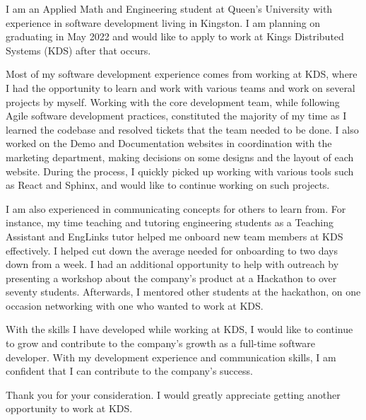 \documentclass[../bryan-hoang-cover-letter.tex]{subfiles}
\begin{document}



  \makelettertitle{}

  \begin{cvletter}
    I am an Applied Math and Engineering student at Queen's University with experience in software development living in Kingston. I am planning on graduating in May 2022 and would like to apply to work at Kings Distributed Systems (KDS) after that occurs.

    Most of my software development experience comes from working at KDS, where I had the opportunity to learn and work with various teams and work on several projects by myself. Working with the core development team, while following Agile software development practices, constituted the majority of my time as I learned the codebase and resolved tickets that the team needed to be done. I also worked on the Demo and Documentation websites in coordination with the marketing department, making decisions on some designs and the layout of each website. During the process, I quickly picked up working with various tools such as React and Sphinx, and would like to continue working on such projects.

    I am also experienced in communicating concepts for others to learn from. For instance, my time teaching and tutoring engineering students as a Teaching Assistant and EngLinks tutor helped me onboard new team members at KDS effectively. I helped cut down the average needed for onboarding to two days down from a week. I had an additional opportunity to help with outreach by presenting a workshop about the company's product at a Hackathon to over seventy students. Afterwards, I mentored other students at the hackathon, on one occasion networking with one who wanted to work at KDS\@.

    With the skills I have developed while working at KDS, I would like to continue to grow and contribute to the company's growth as a full-time software developer. With my development experience and communication skills, I am confident that I can contribute to the company's success.

    Thank you for your consideration. I would greatly appreciate getting another opportunity to work at KDS\@.
  \end{cvletter}
\end{document}
